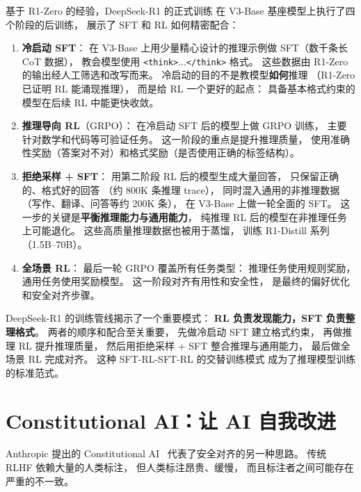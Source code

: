 基于 R1-Zero 的经验，DeepSeek-R1 的正式训练
在 V3-Base 基座模型上执行了四个阶段的后训练，
展示了 SFT 和 RL 如何精密配合：
\begin{enumerate}[noitemsep]
  \item \textbf{冷启动 SFT}：
        在 V3-Base 上用少量精心设计的推理示例做 SFT（数千条长 CoT 数据），
        教会模型使用 \texttt{<think>}...\texttt{</think>} 格式。
        这些数据由 R1-Zero 的输出经人工筛选和改写而来。
        冷启动的目的不是教模型\textbf{如何}推理
       （R1-Zero 已证明 RL 能涌现推理），
        而是给 RL 一个更好的起点：
        具备基本格式约束的模型在后续 RL 中能更快收敛。
  \item \textbf{推理导向 RL}（GRPO）：
        在冷启动 SFT 后的模型上做 GRPO 训练，
        主要针对数学和代码等可验证任务。
        这一阶段的重点是提升推理质量，
        使用准确性奖励（答案对不对）和格式奖励（是否使用正确的标签结构）。
  \item \textbf{拒绝采样 + SFT}：
        用第二阶段 RL 后的模型生成大量回答，
        只保留正确的、格式好的回答
       （约 800K 条推理 trace），
        同时混入通用的非推理数据
       （写作、翻译、问答等约 200K 条），
        在 V3-Base 上做一轮全面的 SFT。
        这一步的关键是\textbf{平衡推理能力与通用能力}，
        纯推理 RL 后的模型在非推理任务上可能退化。
        这些高质量推理数据也被用于蒸馏，
        训练 R1-Distill 系列（1.5B--70B）。
  \item \textbf{全场景 RL}：
        最后一轮 GRPO 覆盖所有任务类型：
        推理任务使用规则奖励，
        通用任务使用奖励模型。
        这一阶段对齐有用性和安全性，
        是最终的偏好优化和安全对齐步骤。
\end{enumerate}

\begin{keybox}[R1 训练的核心洞见]
DeepSeek-R1 的训练管线揭示了一个重要模式：
\textbf{RL 负责发现能力，SFT 负责整理格式}。
两者的顺序和配合至关重要，
先做冷启动 SFT 建立格式约束，
再做推理 RL 提升推理质量，
然后用拒绝采样 + SFT 整合推理与通用能力，
最后做全场景 RL 完成对齐。
这种 SFT-RL-SFT-RL 的交替训练模式
成为了推理模型训练的标准范式。
\end{keybox}

\section{Constitutional AI：让 AI 自我改进}

Anthropic 提出的 Constitutional AI~\cite{bai2022constitutional}
代表了安全对齐的另一种思路。
传统 RLHF 依赖大量的人类标注，
但人类标注昂贵、缓慢，
而且标注者之间可能存在严重的不一致。

